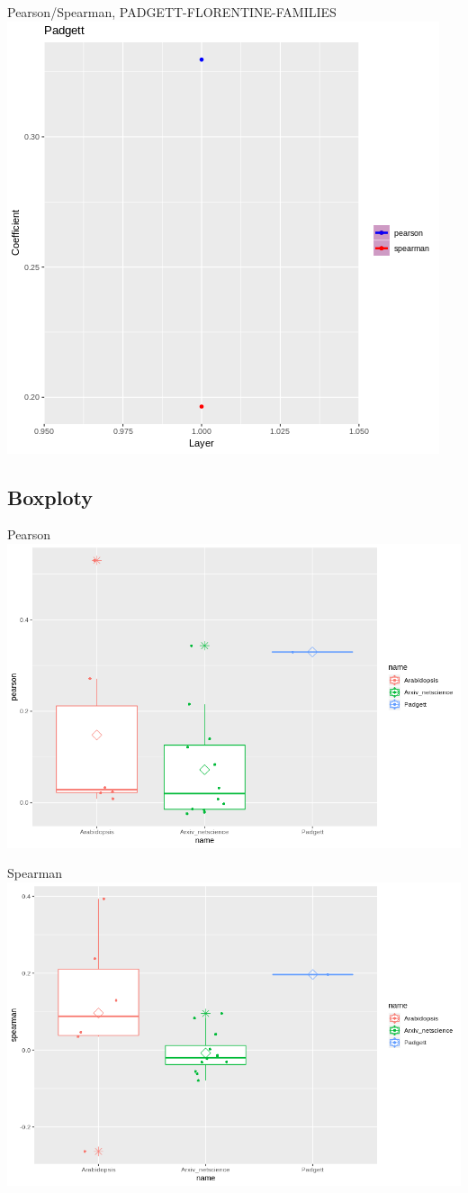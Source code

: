 \documentclass{beamer}
\begin{document}
\begin{frame}{Pearson/Spearman, PADGETT-FLORENTINE-FAMILIES} 
\includegraphics[scale=0.5]{plot3}
\end{frame}

\subsection{Boxploty}
\begin{frame}{Pearson} 
\includegraphics[scale=0.42]{boxplotPearson}
\end{frame}
\begin{frame}{Spearman} 
\includegraphics[scale=0.42]{boxplotSpearman}
\end{frame}
\end{document}
